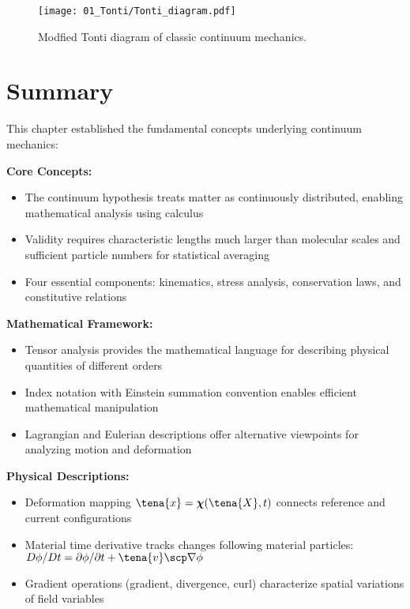 \begin{figure}[H]
\centering
\texttt{[image: 01\_Tonti/Tonti\_diagram.pdf]}
\caption{Modfied Tonti diagram of classic continuum mechanics.}\label{fig:tonti}
\end{figure}



\section{Summary}

\begin{subox}[Summary]
This chapter established the fundamental concepts underlying continuum mechanics:

\textbf{Core Concepts:}
\begin{itemize}
\item The continuum hypothesis treats matter as continuously distributed, enabling mathematical analysis using calculus
\item Validity requires characteristic lengths much larger than molecular scales and sufficient particle numbers for statistical averaging
\item Four essential components: kinematics, stress analysis, conservation laws, and constitutive relations
\end{itemize}

\textbf{Mathematical Framework:}
\begin{itemize}
\item Tensor analysis provides the mathematical language for describing physical quantities of different orders
\item Index notation with Einstein summation convention enables efficient mathematical manipulation
\item Lagrangian and Eulerian descriptions offer alternative viewpoints for analyzing motion and deformation
\end{itemize}

\textbf{Physical Descriptions:}
\begin{itemize}
\item Deformation mapping $\tena{x} = \boldsymbol{\chi}(\tena{X}, t)$ connects reference and current configurations
\item Material time derivative tracks changes following material particles: $D\phi/Dt = \partial\phi/\partial t + \tena{v} \scp \nabla \phi$
\item Gradient operations (gradient, divergence, curl) characterize spatial variations of field variables
\end{itemize}


\end{subox}
